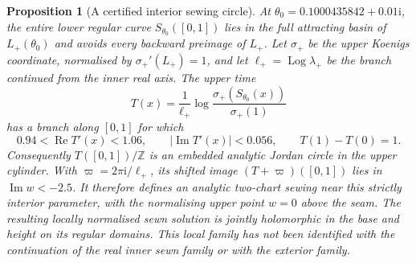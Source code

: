 \documentclass[11pt]{amsart}
\newtheorem{proposition}[theorem]{Proposition}
\theoremstyle{definition}
\newcommand{\ii}{\mathrm{i}}
\begin{document}
\begin{proposition}[A certified interior sewing circle]
\label{prop:interior-sewing-circle}
At $\theta_0=0.1000435842+0.01\ii$, the entire lower regular
curve $S_{\theta_0}([0,1])$ lies in the full attracting basin of
$L_+(\theta_0)$ and avoids every backward preimage of $L_+$.
Let $\sigma_+$ be the upper Koenigs coordinate, normalised by
$\sigma_+'(L_+)=1$, and let
$\ell_+=\operatorname{Log}\lambda_+$ be the branch continued from the inner real
axis.  The upper time
\[
 T(x)=\frac{1}{\ell_+}
 \log\frac{\sigma_+(S_{\theta_0}(x))}{\sigma_+(1)}
\]
has a branch along $[0,1]$ for which
\[
 0.94<\operatorname{Re}T'(x)<1.06,
 \qquad |\operatorname{Im}T'(x)|<0.056,
 \qquad T(1)-T(0)=1.
\]
Consequently $T([0,1])/\mathbb Z$ is an embedded analytic Jordan
circle in the upper cylinder.  With
$\varpi=2\pi\ii/\ell_+$, its shifted image
$(T+\varpi)([0,1])$ lies in $\operatorname{Im}w<-2.5$.
It therefore defines an analytic two-chart sewing near this
strictly interior parameter, with the normalising upper point $w=0$
above the seam.  The resulting locally normalised sewn solution is
jointly holomorphic in the base and height on its regular domains.
This local family has not been identified with the continuation of
the real inner sewn family or with the exterior family.
\end{proposition}
\end{document}
